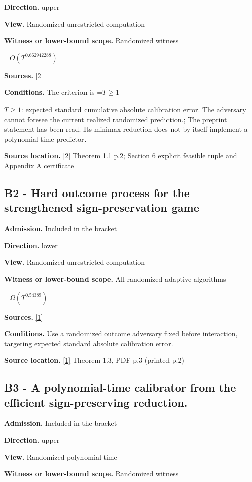 \documentclass[10pt,a4paper]{article}
\newcommand{\AtlasMath}[1]{\par\begingroup\centering\setbox0=\hbox{$\displaystyle #1$}\ifdim\wd0>1.4\linewidth\typeout{ATLAS WIDE FORMULA: \the\wd0}\fi\ifdim\wd0>\linewidth\resizebox{\linewidth}{!}{\box0}\else\box0\fi\par\endgroup}
\newcommand{\AtlasInlineMath}[1]{\begingroup\setbox0=\hbox{$#1$}\ifdim\wd0>.4\linewidth\endgroup\AtlasMath{#1}\else\endgroup$#1$\fi}
\begin{document}
\textbf{Direction.} upper

\textbf{View.} Randomized unrestricted computation

\textbf{Witness or lower-bound scope.} Randomized witness

\AtlasMath{O\!\left(T^{0.662942288}\right)}
\textbf{Sources.} \href{https://arxiv.org/pdf/2610.07623v2}{[2]}

\textbf{Conditions.} The criterion is \AtlasInlineMath{T\ge1}: expected standard cumulative absolute calibration error. The adversary cannot foresee the current realized randomized prediction.; The preprint statement has been read. Its minimax reduction does not by itself implement a polynomial-time predictor.

\textbf{Source location.} \href{https://arxiv.org/pdf/2610.07623v2}{[2]} Theorem 1.1 p.2; Section 6 explicit feasible tuple and Appendix A certificate

\subsection{B2 - Hard outcome process for the strengthened sign-preservation game}
\textbf{Admission.} Included in the bracket

\textbf{Direction.} lower

\textbf{View.} Randomized unrestricted computation

\textbf{Witness or lower-bound scope.} All randomized adaptive algorithms

\AtlasMath{\Omega\!\left(T^{0.54389}\right)}
\textbf{Sources.} \href{https://arxiv.org/pdf/2406.13668v1}{[1]}

\textbf{Conditions.} Use a randomized outcome adversary fixed before interaction, targeting expected standard absolute calibration error.

\textbf{Source location.} \href{https://arxiv.org/pdf/2406.13668v1}{[1]} Theorem 1.3, PDF p.3 (printed p.2)

\subsection{B3 - A polynomial-time calibrator from the efficient sign-preserving reduction.}
\textbf{Admission.} Included in the bracket

\textbf{Direction.} upper

\textbf{View.} Randomized polynomial time

\textbf{Witness or lower-bound scope.} Randomized witness
\end{document}
